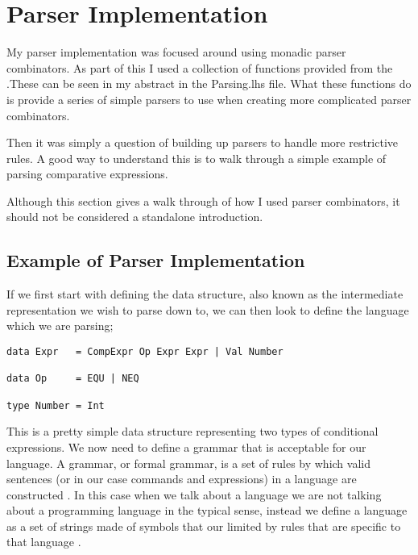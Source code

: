 \section{Parser Implementation}

My parser implementation was focused around using monadic parser combinators. As part of this I used a collection of functions provided from the \cite{Hutton98}.These can be seen in my abstract in the Parsing.lhs file. What these functions do is provide a series of simple parsers to use when creating more complicated parser combinators. 

Then it was simply a question of building up parsers to handle more restrictive rules. A good way to understand this is to walk through a simple example of parsing comparative expressions. 

Although this section gives a walk through of how I used parser combinators, it should not be considered a standalone introduction. 

\newpage

\subsection{Example of Parser Implementation}

If we first start with defining the data structure, also known as the intermediate representation we wish to parse down to, we can then look to define the language which we are parsing;

\begin{lstlisting}
data Expr 	= CompExpr Op Expr Expr | Val Number
	
data Op		= EQU | NEQ 
	
type Number	= Int 
\end{lstlisting}

This is a pretty simple data structure representing two types of conditional expressions. We now need to define a grammar that is acceptable for our language. A grammar, or formal grammar, is a set of rules by which valid sentences (or in our case commands and expressions) in a language are constructed \footnotemark[1].  In this case when we talk about a language we are not talking about a programming language in the typical sense, instead we define a language as a set of strings made of symbols that our limited by rules that are specific to that language \footnotemark[2]. 


